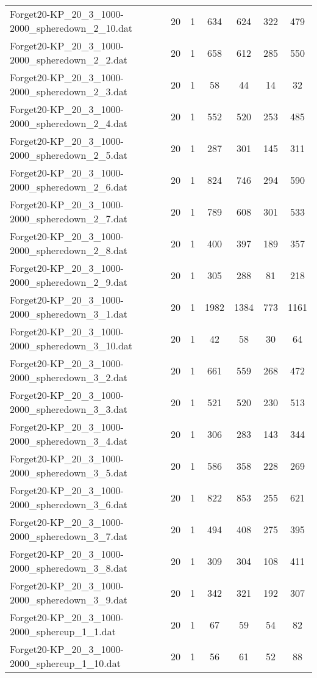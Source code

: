 \begin{table}[!ht]
\begin{tabular}{lcccccc}
Forget20-KP\_20\_3\_1000-2000\_spheredown\_2\_10.dat & 20 & 1 & 634 & 624 & 322 & 479 \\
Forget20-KP\_20\_3\_1000-2000\_spheredown\_2\_2.dat & 20 & 1 & 658 & 612 & 285 & 550 \\
Forget20-KP\_20\_3\_1000-2000\_spheredown\_2\_3.dat & 20 & 1 & 58 & 44 & 14 & 32 \\
Forget20-KP\_20\_3\_1000-2000\_spheredown\_2\_4.dat & 20 & 1 & 552 & 520 & 253 & 485 \\
Forget20-KP\_20\_3\_1000-2000\_spheredown\_2\_5.dat & 20 & 1 & 287 & 301 & 145 & 311 \\
Forget20-KP\_20\_3\_1000-2000\_spheredown\_2\_6.dat & 20 & 1 & 824 & 746 & 294 & 590 \\
Forget20-KP\_20\_3\_1000-2000\_spheredown\_2\_7.dat & 20 & 1 & 789 & 608 & 301 & 533 \\
Forget20-KP\_20\_3\_1000-2000\_spheredown\_2\_8.dat & 20 & 1 & 400 & 397 & 189 & 357 \\
Forget20-KP\_20\_3\_1000-2000\_spheredown\_2\_9.dat & 20 & 1 & 305 & 288 & 81 & 218 \\
Forget20-KP\_20\_3\_1000-2000\_spheredown\_3\_1.dat & 20 & 1 & 1982 & 1384 & 773 & 1161 \\
Forget20-KP\_20\_3\_1000-2000\_spheredown\_3\_10.dat & 20 & 1 & 42 & 58 & 30 & 64 \\
Forget20-KP\_20\_3\_1000-2000\_spheredown\_3\_2.dat & 20 & 1 & 661 & 559 & 268 & 472 \\
Forget20-KP\_20\_3\_1000-2000\_spheredown\_3\_3.dat & 20 & 1 & 521 & 520 & 230 & 513 \\
Forget20-KP\_20\_3\_1000-2000\_spheredown\_3\_4.dat & 20 & 1 & 306 & 283 & 143 & 344 \\
Forget20-KP\_20\_3\_1000-2000\_spheredown\_3\_5.dat & 20 & 1 & 586 & 358 & 228 & 269 \\
Forget20-KP\_20\_3\_1000-2000\_spheredown\_3\_6.dat & 20 & 1 & 822 & 853 & 255 & 621 \\
Forget20-KP\_20\_3\_1000-2000\_spheredown\_3\_7.dat & 20 & 1 & 494 & 408 & 275 & 395 \\
Forget20-KP\_20\_3\_1000-2000\_spheredown\_3\_8.dat & 20 & 1 & 309 & 304 & 108 & 411 \\
Forget20-KP\_20\_3\_1000-2000\_spheredown\_3\_9.dat & 20 & 1 & 342 & 321 & 192 & 307 \\
Forget20-KP\_20\_3\_1000-2000\_sphereup\_1\_1.dat & 20 & 1 & 67 & 59 & 54 & 82 \\
Forget20-KP\_20\_3\_1000-2000\_sphereup\_1\_10.dat & 20 & 1 & 56 & 61 & 52 & 88 \\

\end{tabular}
\end{table}
